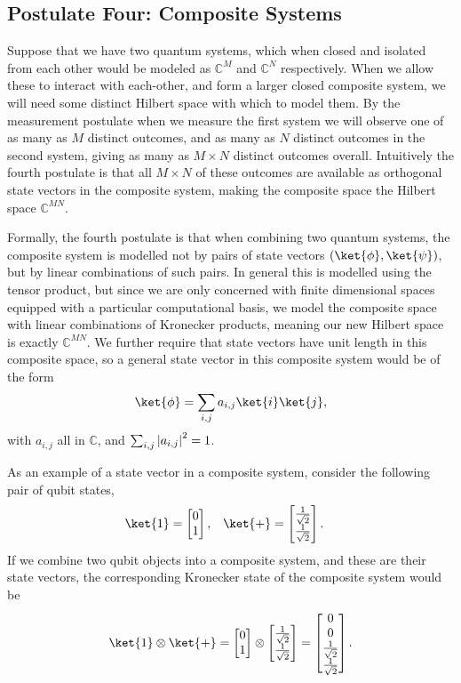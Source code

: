 \subsection{Postulate Four: Composite Systems}
Suppose that we have two quantum systems, which when closed and isolated from each other would be modeled as $\mathbb{C}^{M}$ and $\mathbb{C}^{N}$ respectively. When we allow these to interact with each-other, and form a larger closed composite system, we will need some distinct Hilbert space with which to model them. By the measurement postulate when we measure the first system we will observe one of as many as $M$ distinct outcomes, and as many as $N$ distinct outcomes in the second system, giving as many as $M \times N$ distinct outcomes overall. Intuitively the fourth postulate is that all $M \times N$ of these outcomes are available as orthogonal state vectors in the composite system, making the composite space the Hilbert space $\mathbb{C}^{MN}$.

Formally, the fourth postulate is that when combining two quantum systems, the composite system is modelled not by pairs of state vectors $(\ket{\phi}, \ket{\psi})$, but by linear combinations of such pairs. In general this is modelled using the tensor product, but since we are only concerned with finite dimensional spaces equipped with a particular computational basis, we model the composite space with linear combinations of Kronecker products, meaning our new Hilbert space is exactly $\mathbb{C}^{MN}$. We further require that state vectors have unit length in this composite space, so a general state vector in this composite system would be of the form
\[\ket{\phi} = \sum_{i, j} a_{i,j}\ket{i}\ket{j},\]
with $a_{i,j}$ all in $\mathbb{C}$, and $\sum_{i,j} \left| a_{i,j} \right|^2 = 1$.

As an example of a state vector in a composite system, consider the following pair of qubit states,
\begin{align*}
\ket{1} = \left[\begin{matrix}0\\1\end{matrix}\right],
&&&
\ket{+} = \left[\begin{matrix}\frac{1}{\sqrt{2}}\\\frac{1}{\sqrt{2}}\end{matrix}\right].
\end{align*}
If we combine two qubit objects into a composite system, and these are their state vectors, the corresponding Kronecker state of the composite system would be
\[
\ket{1}\otimes \ket{+} = \left[\begin{matrix}0\\1\end{matrix}\right]
\otimes
\left[\begin{matrix}\frac{1}{\sqrt{2}}\\\frac{1}{\sqrt{2}}\end{matrix}\right]
=
\left[\begin{matrix}0\\0\\\frac{1}{\sqrt{2}}\\\frac{1}{\sqrt{2}}\end{matrix}\right].
\]


